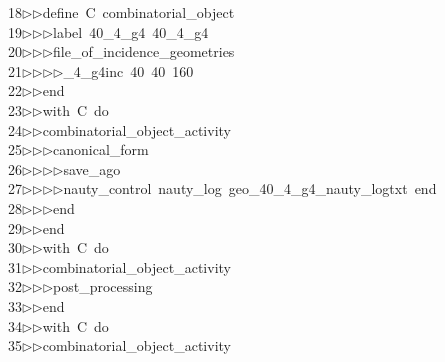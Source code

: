 \begin{tabbing}
18\>$\triangleright$\>$\triangleright$\>define\ C\ combinatorial\_object\ \\[0pt]
19\>$\triangleright$\>$\triangleright$\>$\triangleright$\>label\ 40\_4\_g4\ 40\_4\_g4\ \\[0pt]
20\>$\triangleright$\>$\triangleright$\>$\triangleright$\>file\_of\_incidence\_geometries\ \\[0pt]
21\>$\triangleright$\>$\triangleright$\>$\triangleright$\>$\triangleright$\_4\_g4inc\ 40\ 40\ 160\ \\[0pt]
22\>$\triangleright$\>$\triangleright$\>end\ \\[0pt]
23\>$\triangleright$\>$\triangleright$\>with\ C\ do\ \\[0pt]
24\>$\triangleright$\>$\triangleright$\>combinatorial\_object\_activity\ \\[0pt]
25\>$\triangleright$\>$\triangleright$\>$\triangleright$\>canonical\_form\ \\[0pt]
26\>$\triangleright$\>$\triangleright$\>$\triangleright$\>$\triangleright$\>save\_ago\ \\[0pt]
27\>$\triangleright$\>$\triangleright$\>$\triangleright$\>$\triangleright$\>nauty\_control\ nauty\_log\ geo\_40\_4\_g4\_nauty\_logtxt\ end\ \\[0pt]
28\>$\triangleright$\>$\triangleright$\>$\triangleright$\>end\ \\[0pt]
29\>$\triangleright$\>$\triangleright$\>end\ \\[0pt]
30\>$\triangleright$\>$\triangleright$\>with\ C\ do\ \\[0pt]
31\>$\triangleright$\>$\triangleright$\>combinatorial\_object\_activity\ \\[0pt]
32\>$\triangleright$\>$\triangleright$\>$\triangleright$\>post\_processing\ \\[0pt]
33\>$\triangleright$\>$\triangleright$\>end\ \\[0pt]
34\>$\triangleright$\>$\triangleright$\>with\ C\ do\ \\[0pt]
35\>$\triangleright$\>$\triangleright$\>combinatorial\_object\_activity\ \\[0pt]

\end{tabbing}
